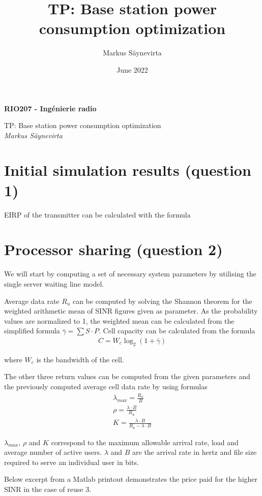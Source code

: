 \documentclass{article}
\title{TP: Base station power consumption optimization}
\author{Markus Säynevirta}
\date{June 2022}
\begin{document}
\thispagestyle{plain}

\large
\textbf{RIO207 - Ingénierie radio}

\large
TP: Base station power consumption optimization\\
\textit{Markus Säynevirta}
\vspace{0.5cm}

\section{Initial simulation results (question 1)}

EIRP of the transmitter can be calculated with the formula 

\section{Processor sharing (question 2)}
\label{processor_sharing}

We will start by computing a set of necessary system parameters by utilising the single server waiting line model.

Average data rate \(R_u\) can be computed by solving the Shannon theorem for the weighted arithmetic mean of SINR figures given as parameter. As the probability values are normalized to 1, the weighted mean can be calculated from the simplified formula \(\bar{\gamma} = \sum S \cdot P\). Cell capacity can be calculated from the formula
\begin{gather*}
    C = W_c \log_2(1 + \bar{\gamma})
\end{gather*}

where \(W_c\) is the bandwidth of the cell.

The other three return values can be computed from the given parameters and the previously computed average cell data rate by using formulas
\begin{gather*}
    \lambda_{max} = \frac{R_u}{B} \\
    \rho = \frac{\lambda \cdot B}{R_u} \\
    K = \frac{\lambda \cdot B}{R_u - \lambda \cdot B}
\end{gather*}

\(\lambda_{max}\), \(\rho\) and \(K\) correspond to the maximum allowable arrival rate, load and average number of active users. \(\lambda\) and \(B\) are the arrival rate in hertz and file size required to serve an individual user in bits.

Below excerpt from a Matlab printout demonstrates the price paid for the higher SINR in the case of reuse 3.
\end{document}

